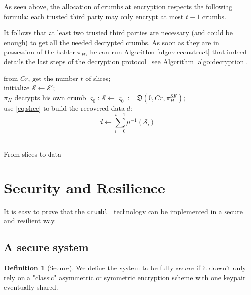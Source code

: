 \documentclass[twoside,twocolumn]{article}
\theoremstyle{definition}
\newtheorem{definition}{Definition}
\theoremstyle{remark}
\begin{document}
As seen above, the allocation of crumbs at encryption respects the following formula: each trusted third party may only encrypt at most $t-1$ crumbs.

It follows that at least two trusted third parties are necessary (and could be enough) to get all the needed decrypted crumbs. As soon as they are in 
possession of the holder $\pi_H$, he can run Algorithm \ref{algo:deconstruct} that indeed details the last steps of the decryption protocol 
\textemdash~see Algorithm \ref{algo:decryption}.
\begin{algorithm}
    from $Cr$, get the number $t$ of slices; \\
    initialize $\mathcal{S} \gets \mathcal{S}'$; \\
    $\pi_H$ decrypts his own crumb $\varsigma_0$: $\mathcal{S} \gets \varsigma_0 := \mathfrak{D}(0, Cr, \pi_H^{SK})$; \\
    use \ref{eq:slice} to build the recovered data $d$:$$ 
        d \gets \sum_{i=0}^{t-1} \mu^{-1}(\mathcal{S}_i)
    $$ \\
    \caption{From slices to data}
    \label{algo:deconstruct}
\end{algorithm}


\section{Security and Resilience}
\label{security}

It is easy to prove that the \texttt{crumbl}\texttrademark~ technology can be implemented in a secure and resilient way.

\subsection{A secure system}

\begin{definition}[Secure]
    \label{secure}
    We define the system to be fully \emph{secure} if it doesn't only rely on a "classic" asymmetric or symmetric encryption scheme with one keypair 
    eventually shared.
\end{definition}
\end{document}
